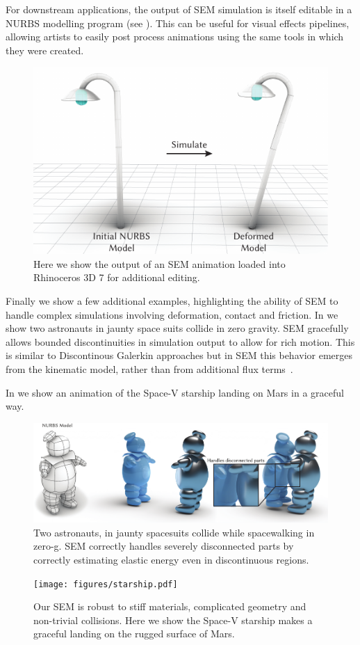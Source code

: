 For downstream applications, the output of  SEM simulation is itself editable in a NURBS modelling program (see ). 
This can be useful for visual effects pipelines, allowing artists to easily post process animations using the same tools in which they were created.
\begin{figure}[h]
  \includegraphics[width=\columnwidth]{figures/export_iges.pdf}
  \caption{Here we show the output of an SEM animation loaded into Rhinoceros 3D 7 for additional editing.}
  \label{fig:edit}
\end{figure}

Finally we show a few additional examples, highlighting the ability of SEM to handle complex simulations involving deformation, contact and friction.
In  we show two astronauts in jaunty space suits collide in zero gravity. 
SEM gracefully allows bounded discontinuities in simulation output to allow for rich motion. 
This is similar to Discontinous Galerkin approaches but in SEM this behavior emerges from the kinematic model, rather than from additional flux terms~\cite{kaufmann2009flexible}.

In  we show an animation of the Space-V starship landing on Mars in a graceful way.

\begin{figure}[htp]
  \includegraphics[width=\textwidth]{figures/astronauts.pdf}
  \caption{Two astronauts, in jaunty spacesuits collide while spacewalking in zero-g. SEM correctly handles severely disconnected parts by correctly estimating elastic energy even in discontinuous regions.}
  \label{fig:staypuft}
\end{figure}

\begin{figure}[htp]
  \texttt{[image: figures/starship.pdf]}
  \caption{Our SEM is robust to stiff materials, complicated geometry and non-trivial collisions. Here we show the Space-V starship makes a graceful landing on the rugged surface of Mars. }
  \label{fig:starship}
\end{figure}
